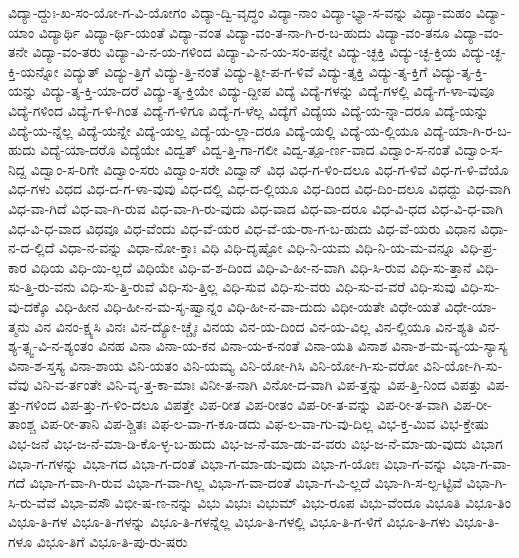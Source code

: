 {ವಿದ್ಯಾ-ದ್ದುಃ-ಖ-ಸಂ-ಯೋ-ಗ-ವಿ-ಯೋಗಂ
ವಿದ್ಯಾ-ದ್ವಿ-ವೃದ್ಧಂ
ವಿದ್ಯಾ-ನಾಂ
ವಿದ್ಯಾ-ಭ್ಯಾ-ಸ-ವನ್ನು
ವಿದ್ಯಾ-ಮಹಂ
ವಿದ್ಯಾ-ಯಾಂ
ವಿದ್ಯಾರ್ಥಿ
ವಿದ್ಯಾ-ರ್ಥಿ-ಯಂತೆ
ವಿದ್ಯಾ-ವಂತ
ವಿದ್ಯಾ-ವಂ-ತ-ನಾ-ಗಿ-ರ-ಬ-ಹುದು
ವಿದ್ಯಾ-ವಂ-ತನೂ
ವಿದ್ಯಾ-ವಂ-ತನೇ
ವಿದ್ಯಾ-ವಂ-ತರು
ವಿದ್ಯಾ-ವಿ-ನ-ಯ-ಗಳಿಂದ
ವಿದ್ಯಾ-ವಿ-ನ-ಯ-ಸಂ-ಪನ್ನೇ
ವಿದ್ಯು-ಚ್ಛಕ್ತಿ
ವಿದ್ಯು-ಚ್ಛ-ಕ್ತಿಯ
ವಿದ್ಯು-ಚ್ಛ-ಕ್ತಿ-ಯನ್ನೋ
ವಿದ್ಯುತ್
ವಿದ್ಯು-ತ್ತಿಗೆ
ವಿದ್ಯು-ತ್ತಿ-ನಂತೆ
ವಿದ್ಯು-ತ್ದೀ-ಪ-ಗ-ಳಿವೆ
ವಿದ್ಯು-ತ್ಶಕ್ತಿ
ವಿದ್ಯು-ತ್ಶ-ಕ್ತಿಗೆ
ವಿದ್ಯು-ತ್ಶ-ಕ್ತಿ-ಯನ್ನು
ವಿದ್ಯು-ತ್ಶ-ಕ್ತಿ-ಯಾ-ದರೆ
ವಿದ್ಯು-ತ್ಶ-ಕ್ತಿಯೇ
ವಿದ್ಯು-ದ್ದೀಪ
ವಿದ್ಯೆ
ವಿದ್ಯೆ-ಗಳನ್ನು
ವಿದ್ಯೆ-ಗಳಲ್ಲಿ
ವಿದ್ಯೆ-ಗ-ಳಾ-ವುವೂ
ವಿದ್ಯೆ-ಗಳಿಂದ
ವಿದ್ಯೆ-ಗ-ಳಿ-ಗಿಂತ
ವಿದ್ಯೆ-ಗ-ಳಿಗೂ
ವಿದ್ಯೆ-ಗ-ಳೆಲ್ಲ
ವಿದ್ಯೆಗೆ
ವಿದ್ಯೆಯ
ವಿದ್ಯೆ-ಯ-ನ್ನಾ-ದರೂ
ವಿದ್ಯೆ-ಯನ್ನು
ವಿದ್ಯೆ-ಯ-ನ್ನೆಲ್ಲ
ವಿದ್ಯೆ-ಯನ್ನೇ
ವಿದ್ಯೆ-ಯಲ್ಲ
ವಿದ್ಯೆ-ಯ-ಲ್ಲಾ-ದರೂ
ವಿದ್ಯೆ-ಯಲ್ಲಿ
ವಿದ್ಯೆ-ಯ-ಲ್ಲಿಯೂ
ವಿದ್ಯೆ-ಯಾ-ಗಿ-ರ-ಬ-ಹುದು
ವಿದ್ಯೆ-ಯಾ-ದರೊ
ವಿದ್ಯೆಯೇ
ವಿದ್ವತ್
ವಿದ್ವ-ತ್ತಿ-ಗಾ-ಗಲೀ
ವಿದ್ವ-ತ್ಪೂ-ರ್ಣ-ವಾದ
ವಿದ್ವಾಂ-ಸ-ನಂತೆ
ವಿದ್ವಾಂ-ಸ-ನಿದ್ದ
ವಿದ್ವಾಂ-ಸ-ರಿಗೇ
ವಿದ್ವಾಂ-ಸರು
ವಿದ್ವಾಂ-ಸರೇ
ವಿದ್ವಾನ್
ವಿಧ
ವಿಧ-ಗ-ಳಿಂ-ದಲೂ
ವಿಧ-ಗ-ಳಿವೆ
ವಿಧ-ಗ-ಳಿ-ವೆಯೊ
ವಿಧ-ಗಳು
ವಿಧದ
ವಿಧ-ದ-ಗ-ಳಾ-ವುವು
ವಿಧ-ದಲ್ಲಿ
ವಿಧ-ದ-ಲ್ಲಿಯೂ
ವಿಧ-ದಿಂದ
ವಿಧ-ದಿಂ-ದಲೂ
ವಿಧದ್ದು
ವಿಧ-ವಾಗಿ
ವಿಧ-ವಾ-ಗಿದೆ
ವಿಧ-ವಾ-ಗಿ-ರುವ
ವಿಧ-ವಾ-ಗಿ-ರು-ವುದು
ವಿಧ-ವಾದ
ವಿಧ-ವಾ-ದರೂ
ವಿಧ-ವಿ-ಧದ
ವಿಧ-ವಿ-ಧ-ವಾಗಿ
ವಿಧ-ವಿ-ಧ-ವಾದ
ವಿಧವೂ
ವಿಧ-ವೆಂದು
ವಿಧ-ವೆ-ಯರ
ವಿಧ-ವೆ-ಯ-ರಾ-ಗ-ಬ-ಹುದು
ವಿಧ-ವೆ-ಯರು
ವಿಧಾನ
ವಿಧಾ-ನ-ದ-ಲ್ಲಿದೆ
ವಿಧಾ-ನ-ವನ್ನು
ವಿಧಾ-ನೋ-ಕ್ತಾಃ
ವಿಧಿ
ವಿಧಿ-ದೃಷ್ಟೋ
ವಿಧಿ-ನಿ-ಯಮ
ವಿಧಿ-ನಿ-ಯ-ಮ-ವನ್ನೂ
ವಿಧಿ-ಪ್ರ-ಕಾರ
ವಿಧಿಯ
ವಿಧಿ-ಯಿ-ಲ್ಲದೆ
ವಿಧಿಯೇ
ವಿಧಿ-ವ-ಶ-ದಿಂದ
ವಿಧಿ-ವಿ-ಹೀ-ನ-ವಾಗಿ
ವಿಧಿ-ಸಿ-ರುವ
ವಿಧಿ-ಸು-ತ್ತಾನೆ
ವಿಧಿ-ಸು-ತ್ತಿ-ರು-ವನು
ವಿಧಿ-ಸು-ತ್ತಿ-ರುವೆ
ವಿಧಿ-ಸು-ತ್ತಿಲ್ಲ
ವಿಧಿ-ಸುವ
ವಿಧಿ-ಸು-ವರು
ವಿಧಿ-ಸು-ವ-ವರೆ
ವಿಧಿ-ಸುವು
ವಿಧಿ-ಸು-ವು-ದಕ್ಕೊ
ವಿಧಿ-ಹೀನ
ವಿಧಿ-ಹೀ-ನ-ಮ-ಸೃ-ಷ್ವಾನ್ನಂ
ವಿಧಿ-ಹೀ-ನ-ವಾ-ದುದು
ವಿಧೀ-ಯತೇ
ವಿಧೇ-ಯತೆ
ವಿಧೇ-ಯಾ-ತ್ಮನು
ವಿನ
ವಿನಂ-ಕ್ಷ್ಯಸಿ
ವಿನಃ
ವಿನ-ದ್ಯೋ-ಚ್ಚೈಃ
ವಿನಯ
ವಿನ-ಯ-ದಿಂದ
ವಿನ-ಯ-ವಿಲ್ಲ
ವಿನ-ಲ್ಲಿಯೂ
ವಿನ-ಶ್ಯತಿ
ವಿನ-ಶ್ಯ-ತ್ಸ್ವ-ವಿ-ನ-ಶ್ಯಂತಂ
ವಿನಹ
ವಿನಾ
ವಿನಾ-ಯ-ಕನ
ವಿನಾ-ಯ-ಕ-ನಂತೆ
ವಿನಾ-ಯತಿ
ವಿನಾಶ
ವಿನಾ-ಶ-ಮ-ವ್ಯ-ಯ-ಸ್ಯಾಸ್ಯ
ವಿನಾ-ಶ-ಸ್ತಸ್ಯ
ವಿನಾ-ಶಾಯ
ವಿನಿ-ಯತಂ
ವಿನಿ-ಯಮ್ಯ
ವಿನಿ-ಯೋ-ಗಿಸಿ
ವಿನಿ-ಯೋ-ಗಿ-ಸು-ವರೋ
ವಿನಿ-ಯೋ-ಗಿ-ಸು-ವೆವು
ವಿನಿ-ವ-ರ್ತಂತೇ
ವಿನಿ-ವೃ-ತ್ತ-ಕಾ-ಮಾಃ
ವಿನೀ-ತ-ನಾಗಿ
ವಿನೋ-ದ-ವಾಗಿ
ವಿಪ-ತ್ತನ್ನು
ವಿಪ-ತ್ತಿ-ನಿಂದ
ವಿಪತ್ತು
ವಿಪ-ತ್ತು-ಗಳಿಂದ
ವಿಪ-ತ್ತು-ಗ-ಳಿಂ-ದಲೂ
ವಿಪತ್ತೇ
ವಿಪ-ರೀತ
ವಿಪ-ರೀತಂ
ವಿಪ-ರೀ-ತ-ವನ್ನು
ವಿಪ-ರೀ-ತ-ವಾಗಿ
ವಿಪ-ರೀ-ತಾಂಶ್ಚ
ವಿಪ-ರೀ-ತಾನಿ
ವಿಪ-ಶ್ಚಿತಃ
ವಿಫ-ಲ-ವಾ-ಗ-ಕೂ-ಡದು
ವಿಫ-ಲ-ವಾ-ಗು-ವು-ದಿಲ್ಲ
ವಿಭ-ಕ್ತ-ಮಿವ
ವಿಭ-ಕ್ತೇಷು
ವಿಭ-ಜನೆ
ವಿಭ-ಜ-ನೆ-ಮಾ-ಡಿ-ಕೊ-ಳ್ಳ-ಬ-ಹುದು
ವಿಭ-ಜ-ನೆ-ಮಾ-ಡು-ವ-ವರು
ವಿಭ-ಜ-ನೆ-ಮಾ-ಡು-ವುದು
ವಿಭಾಗ
ವಿಭಾ-ಗ-ಗಳನ್ನು
ವಿಭಾ-ಗದ
ವಿಭಾ-ಗ-ದಂತೆ
ವಿಭಾ-ಗ-ಮಾ-ಡು-ವುದು
ವಿಭಾ-ಗ-ಯೋಃ
ವಿಭಾ-ಗ-ವನ್ನು
ವಿಭಾ-ಗ-ವಾ-ಗದೆ
ವಿಭಾ-ಗ-ವಾ-ಗಿ-ರುವ
ವಿಭಾ-ಗ-ವಾ-ಗಿಲ್ಲ
ವಿಭಾ-ಗ-ವಾ-ದಂತೆ
ವಿಭಾ-ಗ-ವಿ-ಲ್ಲದೆ
ವಿಭಾ-ಗಿ-ಸ-ಲ್ಪ-ಟ್ಟಿವೆ
ವಿಭಾ-ಗಿ-ಸಿ-ರು-ವೆವೆ
ವಿಭಾ-ವಸೌ
ವಿಭೀ-ಷ-ಣ-ನನ್ನು
ವಿಭು
ವಿಭುಃ
ವಿಭುಮ್
ವಿಭು-ರೂಪ
ವಿಭು-ವೆಂದೂ
ವಿಭೂತಿ
ವಿಭೂ-ತಿಂ
ವಿಭೂ-ತಿ-ಗಳ
ವಿಭೂ-ತಿ-ಗಳನ್ನು
ವಿಭೂ-ತಿ-ಗಳನ್ನೆಲ್ಲ
ವಿಭೂ-ತಿ-ಗಳಲ್ಲಿ
ವಿಭೂ-ತಿ-ಗ-ಳಿಗೆ
ವಿಭೂ-ತಿ-ಗಳು
ವಿಭೂ-ತಿ-ಗಳೂ
ವಿಭೂ-ತಿಗೆ
ವಿಭೂ-ತಿ-ಪು-ರು-ಷರು
}

